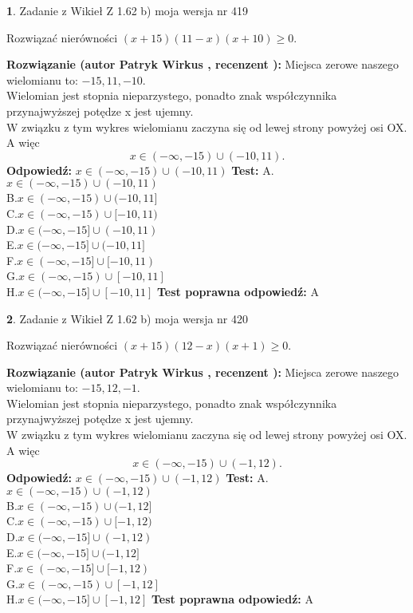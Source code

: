 \documentclass[12pt, a4paper]{article}
\theoremstyle{definition} %
\newtheorem{zad}{}
\newcommand{\zadStart}[1]{\begin{zad}#1\newline}
\newcommand{\zadStop}{\end{zad}}
\newcommand{\rozwStart}[2]{\noindent \textbf{Rozwiązanie (autor #1 , recenzent #2): }\newline}
\newcommand{\rozwStop}{\newline}
\newcommand{\odpStart}{\noindent \textbf{Odpowiedź:}\newline}
\newcommand{\odpStop}{\newline}
\newcommand{\testStart}{\noindent \textbf{Test:}\newline}
\newcommand{\testStop}{\newline}
\newcommand{\kluczStart}{\noindent \textbf{Test poprawna odpowiedź:}\newline}
\newcommand{\kluczStop}{\newline}
\begin{document}
\zadStart{Zadanie z Wikieł Z 1.62 b) moja wersja nr 419}

Rozwiązać nierówności $(x+15)(11-x)(x+10)\ge0$.
\zadStop
\rozwStart{Patryk Wirkus}{}
Miejsca zerowe naszego wielomianu to: $-15, 11, -10$.\\
Wielomian jest stopnia nieparzystego, ponadto znak współczynnika przy\linebreak najwyższej potędze x jest ujemny.\\ W związku z tym wykres wielomianu zaczyna się od lewej strony powyżej osi OX. A więc $$x \in (-\infty,-15) \cup (-10,11).$$
\rozwStop
\odpStart
$x \in (-\infty,-15) \cup (-10,11)$
\odpStop
\testStart
A.$x \in (-\infty,-15) \cup (-10,11)$\\
B.$x \in (-\infty,-15) \cup (-10,11]$\\
C.$x \in (-\infty,-15) \cup [-10,11)$\\
D.$x \in (-\infty,-15] \cup (-10,11)$\\
E.$x \in (-\infty,-15] \cup (-10,11]$\\
F.$x \in (-\infty,-15] \cup [-10,11)$\\
G.$x \in (-\infty,-15) \cup [-10,11]$\\
H.$x \in (-\infty,-15] \cup [-10,11]$
\testStop
\kluczStart
A
\kluczStop



\zadStart{Zadanie z Wikieł Z 1.62 b) moja wersja nr 420}

Rozwiązać nierówności $(x+15)(12-x)(x+1)\ge0$.
\zadStop
\rozwStart{Patryk Wirkus}{}
Miejsca zerowe naszego wielomianu to: $-15, 12, -1$.\\
Wielomian jest stopnia nieparzystego, ponadto znak współczynnika przy\linebreak najwyższej potędze x jest ujemny.\\ W związku z tym wykres wielomianu zaczyna się od lewej strony powyżej osi OX. A więc $$x \in (-\infty,-15) \cup (-1,12).$$
\rozwStop
\odpStart
$x \in (-\infty,-15) \cup (-1,12)$
\odpStop
\testStart
A.$x \in (-\infty,-15) \cup (-1,12)$\\
B.$x \in (-\infty,-15) \cup (-1,12]$\\
C.$x \in (-\infty,-15) \cup [-1,12)$\\
D.$x \in (-\infty,-15] \cup (-1,12)$\\
E.$x \in (-\infty,-15] \cup (-1,12]$\\
F.$x \in (-\infty,-15] \cup [-1,12)$\\
G.$x \in (-\infty,-15) \cup [-1,12]$\\
H.$x \in (-\infty,-15] \cup [-1,12]$
\testStop
\kluczStart
A
\kluczStop
\end{document}

